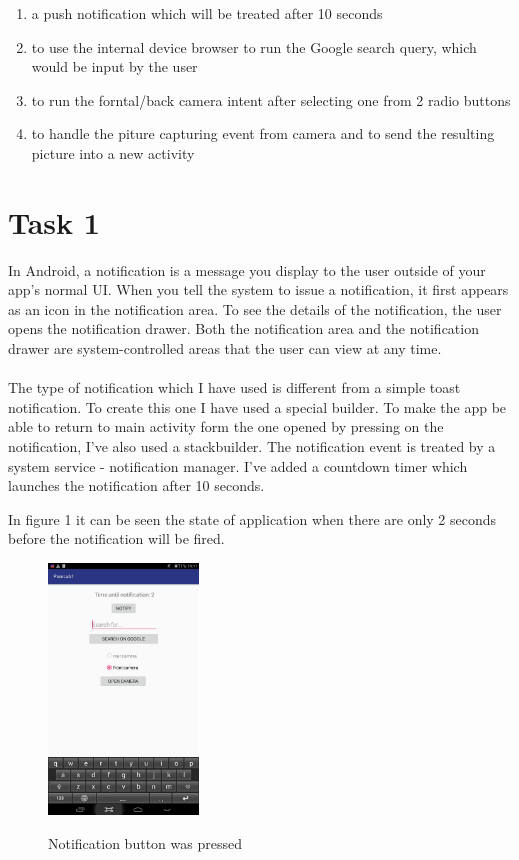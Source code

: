 \documentclass[12pt]{article}
\begin{document}
        \begin{enumerate}
            \item a push notification which will be treated after 10 seconds
            \item to use the internal device browser to run the Google search query, which would be input by the user
            \item to run the forntal/back camera intent after selecting one from 2 radio buttons
            \item to handle the piture capturing event from camera and to send the resulting picture into a new activity
        \end{enumerate}   

    \section*{Task 1}
        In Android, a notification is a message you display to the user outside of your app's normal UI. When you tell the system to issue a notification, it first appears as an icon in the notification area. To see the details of the notification, the user opens the notification drawer. Both the notification area and the notification drawer are system-controlled areas that the user can view at any time.
        \\\\
        The type of notification which I have used is different from a simple toast notification. To create this one I have used a special builder. To make the app be able to return to main activity form the one opened by pressing on the notification, I've also used a stackbuilder. The notification event is treated by a system service - notification manager. I've added a countdown timer which launches the notification after 10 seconds. 

        \newpage
        In figure 1 it can be seen the state of application when there are only 2 seconds before the notification will be fired.

        \begin{figure}[h]
        \centering
        \includegraphics[width=4cm]{s2.jpg}
        \label{fig:s1}
        \caption{Notification button was pressed}
        \end{figure}
\end{document}
